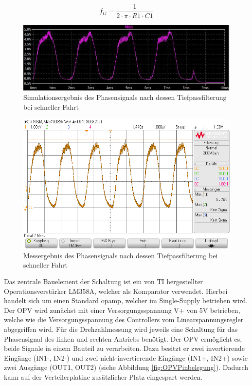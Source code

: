 \begin{equation}\label{eq4.2}
f_G = \frac{ 1 }{2 \cdot \pi \cdot R1\cdot C1 }
\end{equation}

\begin{figure}[H] %
\includegraphics[width=.89\textwidth]{sec4/images/Spannungsverlauf_TP} 
\centering
\captionsetup{width=.95\textwidth}
\caption[Simulationsergebnis des Phasensignals nach dessen Tiefpassfilterung]{Simulationsergebnis des Phasensignals nach dessen Tiefpassfilterung bei schneller Fahrt}\centering
\label{fig:SpannungsverlaufTPSpice}
\end{figure}

\begin{figure}[H] %
\includegraphics[width=.88\textwidth]{sec4/images/TP} 
\centering
\captionsetup{width=.95\textwidth}
\caption[Messergebnis des Phasensignals nach dessen Tiefpassfilterung]{Messergebnis des Phasensignals nach dessen Tiefpassfilterung bei schneller Fahrt}\centering
\label{fig:SpannungsverlaufTPReal}
\end{figure}

Das zentrale Bauelement der Schaltung ist ein von \ac{TI} hergestellter Operationsverstärker LM358A, welcher als Komparator verwendet. Hierbei handelt sich um einen Standard \ac{opamp}, welcher im Single-Supply betrieben wird. Der \ac{OPV} wird zunächst mit einer Versorgungsspannung V+ von 5V betrieben, welche wie die Versorgungsspannung des Controllers vom Linearspannungsregler abgegriffen wird. Für die Drehzahlmessung wird jeweils eine Schaltung für das Phasensignal des linken und rechten Antriebs benötigt. Der \ac{OPV} ermöglicht es, beide Signale in einem Bauteil zu verarbeiten. Dazu besitzt er zwei invertierende Eingänge (IN1-, IN2-) und zwei nicht-invertierende Eingänge (IN1+, IN2+) sowie zwei Ausgänge (OUT1, OUT2) (siehe Abbildung \ref{fig:OPVPinbelegung}). Dadurch kann auf der Verteilerplatine zusätzlicher Platz eingespart werden.


